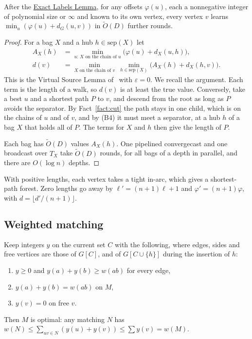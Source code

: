 \documentclass[11pt]{article}
\theoremstyle{definition}
\theoremstyle{remark}
\theoremstyle{plain}
\newenvironment{named}[1]{\def\namedtext{#1}\phantomsection\namedinner}{\endnamedinner}
\newcommand{\LemLabels}{\hyperref[lem:labels]{Exact Labels Lemma}}
\newcommand{\Ot}{\tilde O}
\newcommand{\sep}{\mathrm{sep}}
\begin{document}
\begin{named}{Offset Theorem}\label{thm:off}
After the \LemLabels{}, for any offsets $\varphi(u)$, each a nonnegative integer of polynomial size or $\infty$ and known to its
own vertex, every vertex $v$ learns $\min_u(\varphi(u)+d_G(u,v))$ in $\Ot(D)$ further rounds.
\end{named}
\begin{proof}
For a bag $X$ and a hub $h\in\sep(X)$ let
\begin{align*}
A_X(h)&=\min_{u:\,X\text{ on the chain of }u}\bigl(\varphi(u)+d_X(u,h)\bigr),\\
d(v)&=\min_{X\text{ on the chain of }v}\ \min_{h\in\sep(X)}\bigl(A_X(h)+d_X(h,v)\bigr).
\end{align*}
This is the Virtual Source Lemma of~\cite{S26} with $\varepsilon=0$. We recall the argument. Each term is the length of
a walk, so $d(v)$ is at least the true value. Conversely, take a best $u$ and a shortest path $P$ to $v$, and descend from the root
as long as $P$ avoids the separator. By Fact~\ref{fact:cut} the path stays in one child, which is on the chains of $u$ and of $v$,
and by (B4) it must meet a separator, at a hub $h$ of a bag $X$ that holds all of $P$. The terms for $X$ and $h$ then give the length of $P$.

Each bag has $\Ot(D)$ values $A_X(h)$. One pipelined convergecast and one broadcast over $T_X$ take $\Ot(D)$ rounds, for
all bags of a depth in parallel, and there are $O(\log n)$ depths.
\end{proof}

With positive lengths, each vertex takes a tight in-arc, which gives a shortest-path forest. Zero lengths go away
by $\ell'=(n+1)\ell+1$ and $\varphi'=(n+1)\varphi$, with $d=\lfloor d'/(n+1)\rfloor$.

\subsection{Weighted matching}

Keep integers $y$ on the current set $C$ with the following, where edges, sides and free vertices are those of $G[C]$,
and of $G[C\cup\{h\}]$ during the insertion of $h$:
\begin{enumerate}[(D1)]
\item $y\ge0$ and $y(a)+y(b)\ge w(ab)$ for every edge,
\item $y(a)+y(b)=w(ab)$ on $M$,
\item $y(v)=0$ on free $v$.
\end{enumerate}
Then $M$ is optimal: any matching $N$ has $w(N)\le\sum_{uv\in N}(y(u)+y(v))\le\sum y(v)=w(M)$.
\end{document}

